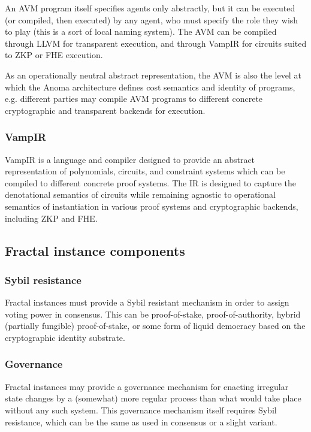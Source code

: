 An AVM program itself specifies agents only abstractly, but it can be
executed (or compiled, then executed) by any agent, who must specify the
role they wish to play (this is a sort of local naming system). The AVM
can be compiled through LLVM for transparent execution, and through
VampIR for circuits suited to ZKP or FHE execution.

As an operationally neutral abstract representation, the AVM is also the
level at which the Anoma architecture defines cost semantics and
identity of programs, e.g. different parties may compile AVM programs to
different concrete cryptographic and transparent backends for execution.

\subsubsection{VampIR}\label{vampir}

VampIR is a language and compiler designed to provide an abstract
representation of polynomials, circuits, and constraint systems which
can be compiled to different concrete proof systems. The IR is designed
to capture the denotational semantics of circuits while remaining
agnostic to operational semantics of instantiation in various proof
systems and cryptographic backends, including ZKP and FHE.

\subsection{Fractal instance
components}\label{fractal-instance-components}

\subsubsection{Sybil resistance}\label{sybil-resistance}

Fractal instances must provide a Sybil resistant mechanism in order to
assign voting power in consensus. This can be proof-of-stake,
proof-of-authority, hybrid (partially fungible) proof-of-stake, or some
form of liquid democracy based on the cryptographic identity substrate.

\subsubsection{Governance}\label{governance}

Fractal instances may provide a governance mechanism for enacting
irregular state changes by a (somewhat) more regular process than what
would take place without any such system. This governance mechanism
itself requires Sybil resistance, which can be the same as used in
consensus or a slight variant.

